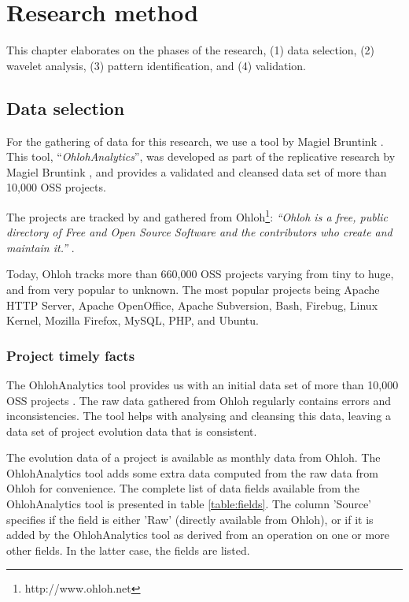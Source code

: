 \chapter{Research method}
\label{method}

This chapter elaborates on the phases of the research, (1) data selection, (2)
wavelet analysis, (3) pattern identification, and (4) validation.

\section{Data selection}
For the gathering of data for this research, we use a tool by Magiel Bruntink
\cite{ohlohanalytics}. This tool, ``\emph{OhlohAnalytics}\rm'', was developed as
part of the replicative research by Magiel Bruntink \cite{bruntink2014}, and
provides a validated and cleansed data set of more than 10,000 OSS projects.

The projects are tracked by and gathered from
Ohloh\footnote{http://www.ohloh.net}: \emph{``Ohloh is a free, public directory
of Free and Open Source Software and the contributors who create and maintain
it.'' }\rm \cite{ohloh}.

Today, Ohloh tracks more than 660,000 OSS projects varying from tiny to huge,
and from very popular to unknown. The most popular projects being Apache HTTP
Server, Apache OpenOffice, Apache Subversion, Bash, Firebug, Linux Kernel,
Mozilla Firefox, MySQL, PHP, and Ubuntu.

\subsection{Project timely facts}
The OhlohAnalytics tool provides us with an initial data set of more than
10,000 OSS projects \cite{bruntink2014}. The raw data gathered from Ohloh
regularly contains errors and inconsistencies. The tool helps with analysing
and cleansing this data, leaving a data set of project evolution data that is
consistent.

The evolution data of a project is available as monthly data from Ohloh. The
OhlohAnalytics tool adds some extra data computed from the raw data from Ohloh
for convenience. The complete list of data fields available from the
OhlohAnalytics tool is presented in table \ref{table:fields}. The column
'Source' specifies if the field is either 'Raw' (directly available from Ohloh),
or if it is added by the OhlohAnalytics tool as derived from an operation on one
or more other fields. In the latter case, the fields are listed.

